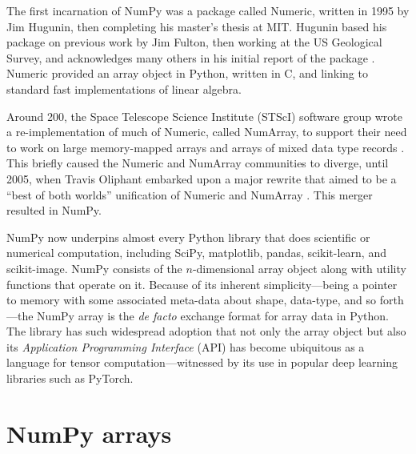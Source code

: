 The first incarnation of NumPy was a package called Numeric, written in 1995
by Jim Hugunin, then completing his master's thesis at MIT.
Hugunin based his package on previous work by Jim Fulton,
then working at the US Geological Survey, and acknowledges
many others in his initial report of the package \cite{Hugunin-whitepaper}.
Numeric provided an array object in Python, written in C, and linking to
standard fast implementations of linear algebra.

Around 200, the Space Telescope Science Institute (STScI) software group wrote
a re-implementation of much of Numeric, called NumArray, to support their
need to work on large memory-mapped arrays and arrays of mixed data type
records \cite{STScI-slither}.
This briefly caused the Numeric and NumArray communities to diverge, until 2005,
when Travis Oliphant embarked upon a major rewrite that aimed to be a ``best of
both worlds'' unification of Numeric and NumArray \cite{oliphant2006guide}.
This merger resulted in NumPy.

NumPy now underpins almost every Python library that does scientific or
numerical computation, including SciPy\cite{virtanen2019scipy},
matplotlib\cite{hunter2007matplotlib}, pandas\cite{mckinney-proc-scipy-2010},
scikit-learn\cite{pedregosa2011scikit}, and
scikit-image\cite{vanderwalt2014scikit}.
NumPy consists of the $n$-dimensional array object along with utility functions
that operate on it.
Because of its inherent simplicity---being a pointer to memory with some
associated meta-data about shape, data-type, and so forth---the NumPy array is
the {\it de facto} exchange format for array data in Python.
The library has such widespread adoption that not only the array object but also its
{\it Application Programming Interface} (API) has become ubiquitous as
a language for tensor computation---witnessed by its use in popular
deep learning libraries such as PyTorch\cite{pytorch}.


\section*{NumPy arrays}


